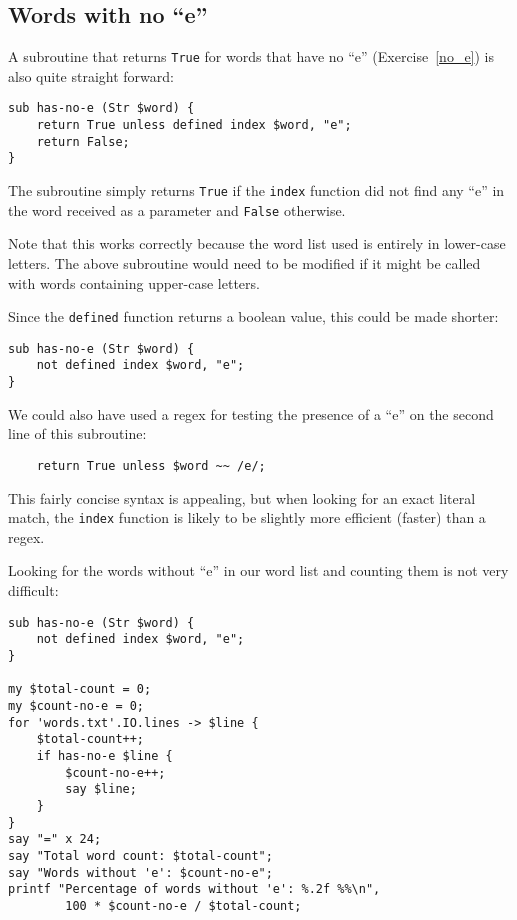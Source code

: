 \subsection{Words with no ``e''}

A subroutine that returns {\tt True} for words that have 
no ``e'' (Exercise~\ref{no_e}) is also quite straight forward:

\begin{verbatim}
sub has-no-e (Str $word) {
    return True unless defined index $word, "e";
    return False;
}
\end{verbatim}
%

The subroutine simply returns {\tt True} if the {\tt index} 
function did not find any ``e'' in the word received as 
a parameter and {\tt False} otherwise. 

Note that this works correctly because the word list used 
is entirely in lower-case letters. The above subroutine 
would need to be modified if it might be called with words 
containing upper-case letters. 

Since the {\tt defined} function returns a boolean value, this 
could be made shorter:
\begin{verbatim}
sub has-no-e (Str $word) {
    not defined index $word, "e";
}
\end{verbatim}
%

We could also have used a regex for testing the presence of a 
``e'' on the second line of this subroutine:

\begin{verbatim}
    return True unless $word ~~ /e/;
\end{verbatim}
%

This fairly concise syntax is appealing, but when 
looking for an exact literal match, the {\tt index} function 
is likely to be slightly more efficient (faster) than a 
regex.

Looking for the words without ``e'' in our word list and 
counting them is not very difficult:

\begin{verbatim}
sub has-no-e (Str $word) {
    not defined index $word, "e";
}

my $total-count = 0;
my $count-no-e = 0;
for 'words.txt'.IO.lines -> $line { 
    $total-count++;
    if has-no-e $line {
        $count-no-e++;
        say $line;
    }
}
say "=" x 24;
say "Total word count: $total-count";
say "Words without 'e': $count-no-e";
printf "Percentage of words without 'e': %.2f %%\n", 
        100 * $count-no-e / $total-count;
\end{verbatim}

